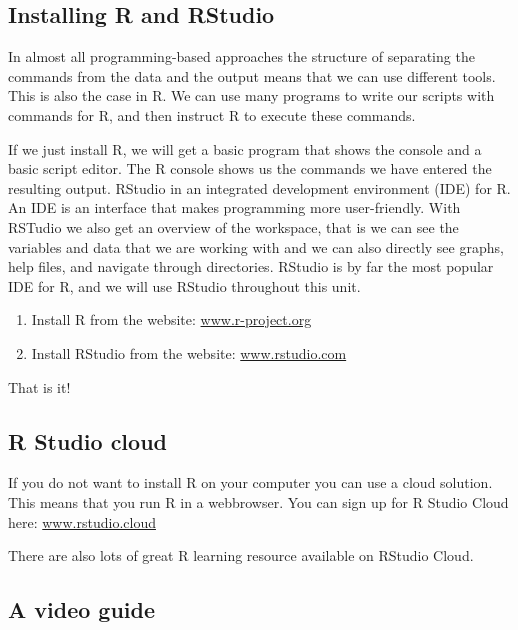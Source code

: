 \documentclass[]{book}
\providecommand{\tightlist}{%
  \setlength{\itemsep}{0pt}\setlength{\parskip}{0pt}}
\begin{document}
\hypertarget{installing-r-and-rstudio}{%
\subsection*{Installing R and RStudio}\label{installing-r-and-rstudio}}

In almost all programming-based approaches the structure of separating the commands from the data and the output means that we can use different tools. This is also the case in R. We can use many programs to write our scripts with commands for R, and then instruct R to execute these commands.

If we just install R, we will get a basic program that shows the console and a basic script editor. The R console shows us the commands we have entered the resulting output. RStudio in an integrated development environment (IDE) for R. An IDE is an interface that makes programming more user-friendly. With RSTudio we also get an overview of the workspace, that is we can see the variables and data that we are working with and we can also directly see graphs, help files, and navigate through directories. RStudio is by far the most popular IDE for R, and we will use RStudio throughout this unit.

\begin{enumerate}
\def\labelenumi{\arabic{enumi}.}
\tightlist
\item
  Install R from the website: \href{https://www.r-project.org/}{www.r-project.org}
\item
  Install RStudio from the website: \href{https://rstudio.com/}{www.rstudio.com}
\end{enumerate}

That is it!

\hypertarget{r-studio-cloud}{%
\subsection*{R Studio cloud}\label{r-studio-cloud}}

If you do not want to install R on your computer you can use a cloud solution. This means that you run R in a webbrowser. You can sign up for R Studio Cloud here: \href{http://rstudio.cloud/}{www.rstudio.cloud}

There are also lots of great R learning resource available on RStudio Cloud.

\hypertarget{a-video-guide}{%
\subsection*{A video guide}\label{a-video-guide}}
\end{document}
